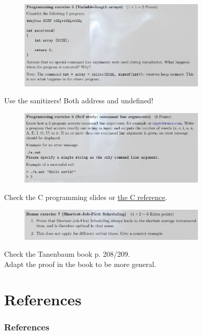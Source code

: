 \documentclass[10pt]{beamer}
\begin{document}
\begin{frame}[allowframebreaks]{}
        \begin{figure}
          \includegraphics[keepaspectratio, width=0.8\textwidth, height=0.8\textheight-2\baselineskip-2\baselineskip]{img/104_ex3.png} \\
        \end{figure}
        Use the sanitizers! Both address and undefined!
        \framebreak 
        
        \begin{figure}
          \includegraphics[keepaspectratio, width=0.8\textwidth, height=0.8\textheight-2\baselineskip-2\baselineskip]{img/105_ex3.png} \\
        \end{figure}
        Check the C programming slides or \href{https://en.cppreference.com/w/c}{the C reference}.
        \framebreak 
        
        \begin{figure}
          \includegraphics[keepaspectratio, width=0.8\textwidth, height=0.8\textheight-2\baselineskip-2\baselineskip]{img/106_ex3.png} \\
        \end{figure}
        Check the Tanenbaum book p. 208/209. \\
        Adapt the proof in the book to be more general.
\end{frame}

\section{References}
    \begin{frame}[allowframebreaks]
      \frametitle{References}
      \begin{tiny}
      \nocite{*}
      \printbibliography
      \end{tiny}
    \end{frame}
\end{document}
